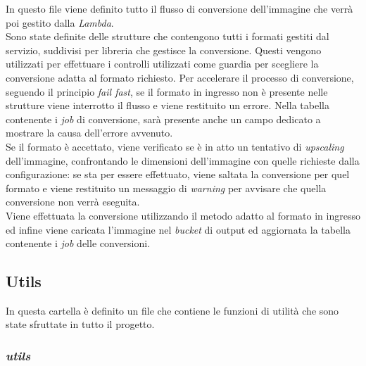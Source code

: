 In questo file viene definito tutto il flusso di conversione dell'immagine che
verrà poi gestito dalla \emph{Lambda}.\\
Sono state definite delle strutture che contengono tutti i formati gestiti dal
servizio, suddivisi per libreria che gestisce la conversione. Questi vengono
utilizzati per effettuare i controlli utilizzati come guardia per scegliere la
conversione adatta al formato richiesto. Per accelerare il processo di
conversione, seguendo il principio \emph{fail fast}, se il formato in ingresso
non è presente nelle strutture viene interrotto il flusso e viene restituito un
errore. Nella tabella contenente i \emph{job} di conversione, sarà presente
anche un campo dedicato a mostrare la causa dell'errore avvenuto.\\
Se il formato è accettato, viene verificato se è in atto un tentativo di
\emph{upscaling} dell'immagine, confrontando le dimensioni dell'immagine con
quelle richieste dalla configurazione: se sta per essere effettuato, viene
saltata la conversione per quel formato e viene restituito un messaggio di
\emph{warning} per avvisare che quella conversione non verrà eseguita.\\
Viene effettuata la conversione utilizzando il metodo adatto al formato in
ingresso ed infine viene caricata l'immagine nel \emph{bucket} di output ed
aggiornata la tabella contenente i \emph{job} delle conversioni.\\


\subsection{Utils}

In questa cartella è definito un file che contiene le funzioni di utilità che
sono state sfruttate in tutto il progetto.

\subsubsection{\emph{utils}}

